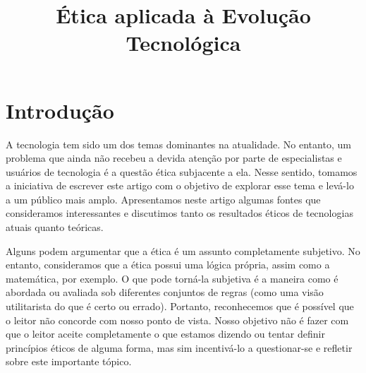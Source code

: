 \documentclass[referee,sn-basic]{sn-jnl}
\theoremstyle{thmstyleone}%
\begin{document}
\title[Article Title]{Ética aplicada à Evolução Tecnológica}





\maketitle

\newpage

\section{Introdução}\label{sec1}

\hspace{0.7cm}A tecnologia tem sido um dos temas dominantes na atualidade. No entanto, um problema que ainda não recebeu a devida atenção por parte de especialistas e usuários de tecnologia é a questão ética subjacente a ela. Nesse sentido, tomamos a iniciativa de escrever este artigo com o objetivo de explorar esse tema e levá-lo a um público mais amplo. Apresentamos neste artigo algumas fontes que consideramos interessantes e discutimos tanto os resultados éticos de tecnologias atuais quanto teóricas.\par 
Alguns podem argumentar que a ética é um assunto completamente subjetivo. No entanto, consideramos que a ética possui uma lógica própria, assim como a matemática, por exemplo. O que pode torná-la subjetiva é a maneira como é abordada ou avaliada sob diferentes conjuntos de regras (como uma visão utilitarista do que é certo ou errado). Portanto, reconhecemos que é possível que o leitor não concorde com nosso ponto de vista. Nosso objetivo não é fazer com que o leitor aceite completamente o que estamos dizendo ou tentar definir princípios éticos de alguma forma, mas sim incentivá-lo a questionar-se e refletir sobre este importante tópico.
\end{document}
